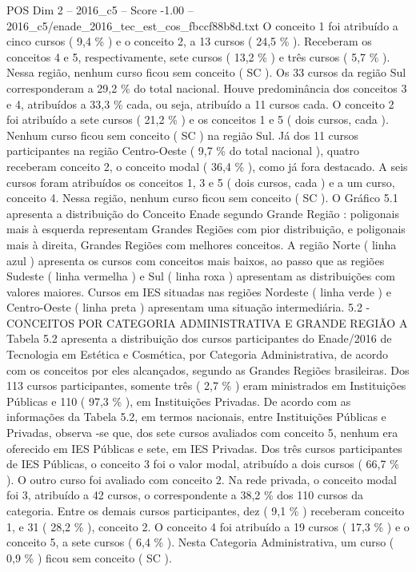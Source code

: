 \begin{textsample}{POS Dim 2 – 2016\_c5 – Score -1.00 – 2016\_c5/enade\_2016\_tec\_est\_cos\_fbccf88b8d.txt}
O conceito 1 foi atribuído a cinco cursos ( 9,4 \% ) e o conceito 2, a 13 cursos ( 24,5 \% ).
Receberam os conceitos 4 e 5, respectivamente, sete cursos ( 13,2 \% ) e três cursos ( 5,7 \% ).
Nessa região, nenhum curso ficou sem conceito ( SC ).
Os 33 cursos da região Sul corresponderam a 29,2 \% do total nacional.
Houve predominância dos conceitos 3 e 4, atribuídos a 33,3 \% cada, ou seja, atribuído a 11 cursos cada.
O conceito 2 foi atribuído a sete cursos ( 21,2 \% ) e os conceitos 1 e 5 ( dois cursos, cada ).
Nenhum curso ficou sem conceito ( SC ) na região Sul.
Já dos 11 cursos participantes na região Centro-Oeste ( 9,7 \% do total nacional ), quatro receberam conceito 2, o conceito modal ( 36,4 \% ), como já fora destacado.
A seis cursos foram atribuídos os conceitos 1, 3 e 5 ( dois cursos, cada ) e a um curso, conceito 4.
Nessa região, nenhum curso ficou sem conceito ( SC ).
O Gráfico 5.1 apresenta a distribuição do Conceito Enade segundo Grande Região : poligonais mais à esquerda representam Grandes Regiões com pior distribuição, e poligonais mais à direita, Grandes Regiões com melhores conceitos.
A região Norte ( linha azul ) apresenta os cursos com conceitos mais baixos, ao passo que as regiões Sudeste ( linha vermelha ) e Sul ( linha roxa ) apresentam as distribuições com valores maiores.
Cursos em IES situadas nas regiões Nordeste ( linha verde ) e Centro-Oeste ( linha preta ) apresentam uma situação intermediária. 5.2 - CONCEITOS POR CATEGORIA ADMINISTRATIVA E GRANDE REGIÃO A Tabela 5.2 apresenta a distribuição dos cursos participantes do Enade/2016 de Tecnologia em Estética e Cosmética, por Categoria Administrativa, de acordo com os conceitos por eles alcançados, segundo as Grandes Regiões brasileiras.
Dos 113 cursos participantes, somente três ( 2,7 \% ) eram ministrados em Instituições Públicas e 110 ( 97,3 \% ), em Instituições Privadas.
De acordo com as informações da Tabela 5.2, em termos nacionais, entre Instituições Públicas e Privadas, observa -se que, dos sete cursos avaliados com conceito 5, nenhum era oferecido em IES Públicas e sete, em IES Privadas.
Dos três cursos participantes de IES Públicas, o conceito 3 foi o valor modal, atribuído a dois cursos ( 66,7 \% ).
O outro curso foi avaliado com conceito 2.
Na rede privada, o conceito modal foi 3, atribuído a 42 cursos, o correspondente a 38,2 \% dos 110 cursos da categoria.
Entre os demais cursos participantes, dez ( 9,1 \% ) receberam conceito 1, e 31 ( 28,2 \% ), conceito 2.
O conceito 4 foi atribuído a 19 cursos ( 17,3 \% ) e o conceito 5, a sete cursos ( 6,4 \% ).
Nesta Categoria Administrativa, um curso ( 0,9 \% ) ficou sem conceito ( SC ).

\end{textsample}
